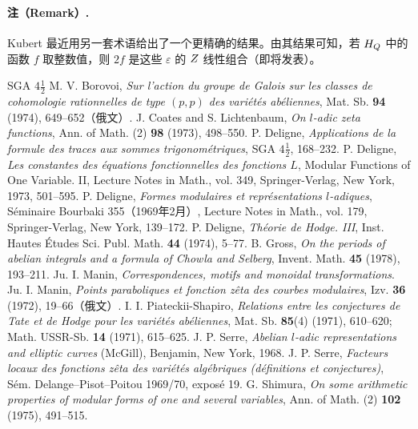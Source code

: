 \paragraph*{注（Remark）.}
Kubert 最近用另一套术语给出了一个更精确的结果。由其结果可知，若 $H_{Q}$ 中的函数 $f$ 取整数值，则 $2f$ 是这些 $\varepsilon$ 的 $Z$ 线性组合（即将发表）。


\begin{thebibliography}{SGA $4\frac12$}
 M. V. Borovoi, \textit{Sur l'action du groupe de Galois sur les classes de cohomologie rationnelles de type $(p,p)$ des variétés abéliennes}, Mat. Sb. \textbf{94} (1974), 649--652（俄文）.
 J. Coates and S. Lichtenbaum, \textit{On $l$-adic zeta functions}, Ann. of Math. (2) \textbf{98} (1973), 498--550.
 P. Deligne, \textit{Applications de la formule des traces aux sommes trigonométriques}, SGA $4\frac12$, 168--232.
 P. Deligne, \textit{Les constantes des équations fonctionnelles des fonctions $L$}, Modular Functions of One Variable. II, Lecture Notes in Math., vol. 349, Springer-Verlag, New York, 1973, 501--595.
 P. Deligne, \textit{Formes modulaires et représentations $l$-adiques}, Séminaire Bourbaki 355（1969年2月）, Lecture Notes in Math., vol. 179, Springer-Verlag, New York, 139--172.
 P. Deligne, \textit{Théorie de Hodge. III}, Inst. Hautes Études Sci. Publ. Math. \textbf{44} (1974), 5--77.
 B. Gross, \textit{On the periods of abelian integrals and a formula of Chowla and Selberg}, Invent. Math. \textbf{45} (1978), 193--211.
 Ju. I. Manin, \textit{Correspondences, motifs and monoidal transformations}.
 Ju. I. Manin, \textit{Points paraboliques et fonction zêta des courbes modulaires}, Izv. \textbf{36} (1972), 19--66（俄文）.
 I. I. Piateckii-Shapiro, \textit{Relations entre les conjectures de Tate et de Hodge pour les variétés abéliennes}, Mat. Sb. \textbf{85}(4) (1971), 610--620; Math. USSR-Sb. \textbf{14} (1971), 615--625.
 J. P. Serre, \textit{Abelian $l$-adic representations and elliptic curves} (McGill), Benjamin, New York, 1968.
 J. P. Serre, \textit{Facteurs locaux des fonctions zêta des variétés algébriques (définitions et conjectures)}, Sém. Delange--Pisot--Poitou 1969/70, exposé 19.
 G. Shimura, \textit{On some arithmetic properties of modular forms of one and several variables}, Ann. of Math. (2) \textbf{102} (1975), 491--515.

\end{thebibliography}
